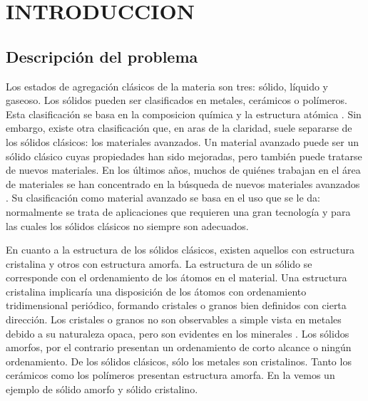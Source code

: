 
\chapter{INTRODUCCION} %

\label{C1} %



\section{Descripción del problema}
\label{S1_1}

Los estados de agregación clásicos de la materia son tres: sólido, líquido y gaseoso. Los sólidos pueden ser clasificados en metales, cerámicos o polímeros. Esta clasificación se basa en la composicion química y la estructura atómica \citep{callister95}. Sin embargo, existe otra clasificación que, en aras de la claridad, suele separarse de los sólidos clásicos: los materiales avanzados. Un material avanzado puede ser un sólido clásico cuyas propiedades han sido mejoradas, pero también puede tratarse de nuevos materiales. En los últimos años, muchos de quiénes trabajan en el área de materiales se han concentrado en la búsqueda de nuevos materiales avanzados \citep{suryana11}. Su clasificación como material avanzado se basa en el uso que se le da: normalmente se trata de aplicaciones que requieren una gran tecnología y para las cuales los sólidos clásicos no siempre son adecuados.

En cuanto a la estructura de los sólidos clásicos, existen aquellos con estructura cristalina y otros con estructura amorfa. La estructura de un sólido se corresponde con el ordenamiento de los átomos en el material. Una estructura cristalina implicaría una disposición de los átomos con ordenamiento tridimensional periódico, formando cristales o granos bien definidos con cierta dirección. Los cristales o granos no son observables a simple vista en metales debido a su naturaleza opaca, pero son evidentes en los minerales \citep{smith96}. Los sólidos amorfos, por el contrario presentan un ordenamiento de corto alcance o ningún ordenamiento. De los sólidos clásicos, sólo los metales son cristalinos. Tanto los cerámicos como los polímeros presentan estructura amorfa. En la  vemos un ejemplo de sólido amorfo y sólido cristalino.

